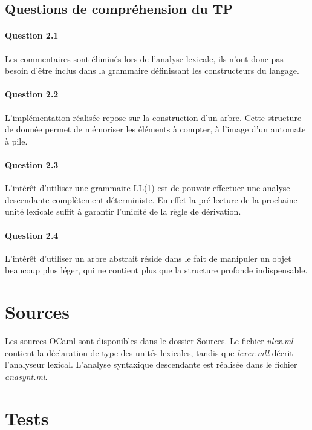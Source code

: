 \documentclass[a4paper]{article}
\begin{document}
\subsection{Questions de compréhension du TP}

\paragraph{Question 2.1}
Les commentaires sont éliminés lors de l'analyse lexicale, ils n'ont donc pas besoin d'être inclus dans la grammaire définissant les constructeurs du langage.

\paragraph{Question 2.2}
L'implémentation réalisée repose sur la construction d'un arbre. Cette structure de donnée permet de mémoriser les éléments à compter, à l'image d'un automate à pile.

\paragraph{Question 2.3}
L'intérêt d'utiliser une grammaire LL(1) est de pouvoir effectuer une analyse descendante complètement déterministe. En effet la pré-lecture de la prochaine unité lexicale suffit à garantir l'unicité de la règle de dérivation.

\paragraph{Question 2.4}
L'intérêt d'utiliser un arbre abstrait réside dans le fait de manipuler un objet beaucoup plus léger, qui ne contient plus que la structure profonde indispensable.

\section{Sources}
Les sources OCaml sont disponibles dans le dossier Sources. Le fichier \textit{ulex.ml} contient la déclaration de type des unités lexicales, tandis que \textit{lexer.mll} décrit l'analyseur lexical.
L'analyse syntaxique descendante est réalisée dans le fichier \textit{anasynt.ml}.

\section{Tests}
\end{document}
